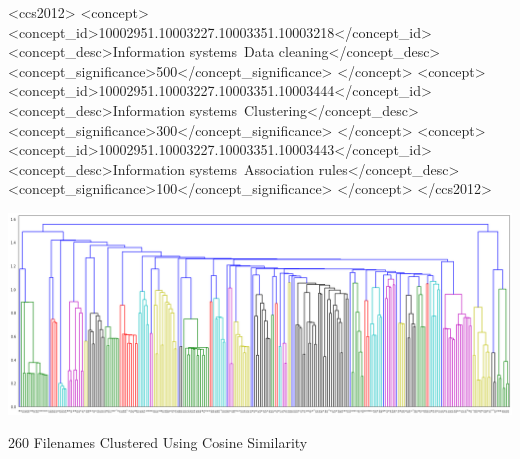 \documentclass[sigconf,authordraft]{acmart}
\begin{document}

 \begin{CCSXML}
<ccs2012>
<concept>
<concept_id>10002951.10003227.10003351.10003218</concept_id>
<concept_desc>Information systems~Data cleaning</concept_desc>
<concept_significance>500</concept_significance>
</concept>
<concept>
<concept_id>10002951.10003227.10003351.10003444</concept_id>
<concept_desc>Information systems~Clustering</concept_desc>
<concept_significance>300</concept_significance>
</concept>
<concept>
<concept_id>10002951.10003227.10003351.10003443</concept_id>
<concept_desc>Information systems~Association rules</concept_desc>
<concept_significance>100</concept_significance>
</concept>
</ccs2012>
\end{CCSXML}



\begin{teaserfigure}
  \includegraphics[width=\textwidth]{dendrogram.png}
  \caption{260 Filenames Clustered Using Cosine Similarity}
  \label{fig:teaser}
\end{teaserfigure}

\maketitle
\end{document}
